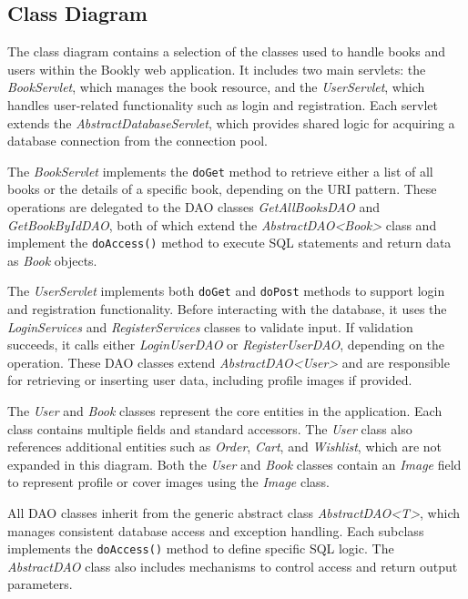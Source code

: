 \subsection{Class Diagram}


The class diagram contains a selection of the classes used to handle books and users within the Bookly web application. It includes two main servlets: the \textit{BookServlet}, which manages the book resource, and the \textit{UserServlet}, which handles user-related functionality such as login and registration. Each servlet extends the \textit{AbstractDatabaseServlet}, which provides shared logic for acquiring a database connection from the connection pool.

The \textit{BookServlet} implements the \texttt{doGet} method to retrieve either a list of all books or the details of a specific book, depending on the URI pattern. These operations are delegated to the DAO classes \textit{GetAllBooksDAO} and \textit{GetBookByIdDAO}, both of which extend the \textit{AbstractDAO\textless Book\textgreater} class and implement the \texttt{doAccess()} method to execute SQL statements and return data as \textit{Book} objects.

The \textit{UserServlet} implements both \texttt{doGet} and \texttt{doPost} methods to support login and registration functionality. Before interacting with the database, it uses the \textit{LoginServices} and \textit{RegisterServices} classes to validate input. If validation succeeds, it calls either \textit{LoginUserDAO} or \textit{RegisterUserDAO}, depending on the operation. These DAO classes extend \textit{AbstractDAO\textless User\textgreater} and are responsible for retrieving or inserting user data, including profile images if provided.

The \textit{User} and \textit{Book} classes represent the core entities in the application. Each class contains multiple fields and standard accessors. The \textit{User} class also references additional entities such as \textit{Order}, \textit{Cart}, and \textit{Wishlist}, which are not expanded in this diagram. Both the \textit{User} and \textit{Book} classes contain an \textit{Image} field to represent profile or cover images using the \textit{Image} class.

All DAO classes inherit from the generic abstract class \textit{AbstractDAO\textless T\textgreater}, which manages consistent database access and exception handling. Each subclass implements the \texttt{doAccess()} method to define specific SQL logic. The \textit{AbstractDAO} class also includes mechanisms to control access and return output parameters.

